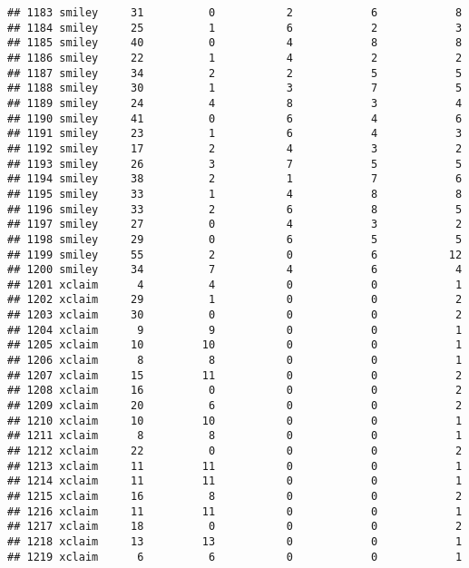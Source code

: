 \documentclass[
]{article}
\begin{document}
\begin{verbatim}
## 1183 smiley     31          0           2            6            8
## 1184 smiley     25          1           6            2            3
## 1185 smiley     40          0           4            8            8
## 1186 smiley     22          1           4            2            2
## 1187 smiley     34          2           2            5            5
## 1188 smiley     30          1           3            7            5
## 1189 smiley     24          4           8            3            4
## 1190 smiley     41          0           6            4            6
## 1191 smiley     23          1           6            4            3
## 1192 smiley     17          2           4            3            2
## 1193 smiley     26          3           7            5            5
## 1194 smiley     38          2           1            7            6
## 1195 smiley     33          1           4            8            8
## 1196 smiley     33          2           6            8            5
## 1197 smiley     27          0           4            3            2
## 1198 smiley     29          0           6            5            5
## 1199 smiley     55          2           0            6           12
## 1200 smiley     34          7           4            6            4
## 1201 xclaim      4          4           0            0            1
## 1202 xclaim     29          1           0            0            2
## 1203 xclaim     30          0           0            0            2
## 1204 xclaim      9          9           0            0            1
## 1205 xclaim     10         10           0            0            1
## 1206 xclaim      8          8           0            0            1
## 1207 xclaim     15         11           0            0            2
## 1208 xclaim     16          0           0            0            2
## 1209 xclaim     20          6           0            0            2
## 1210 xclaim     10         10           0            0            1
## 1211 xclaim      8          8           0            0            1
## 1212 xclaim     22          0           0            0            2
## 1213 xclaim     11         11           0            0            1
## 1214 xclaim     11         11           0            0            1
## 1215 xclaim     16          8           0            0            2
## 1216 xclaim     11         11           0            0            1
## 1217 xclaim     18          0           0            0            2
## 1218 xclaim     13         13           0            0            1
## 1219 xclaim      6          6           0            0            1

\end{verbatim}
\end{document}
